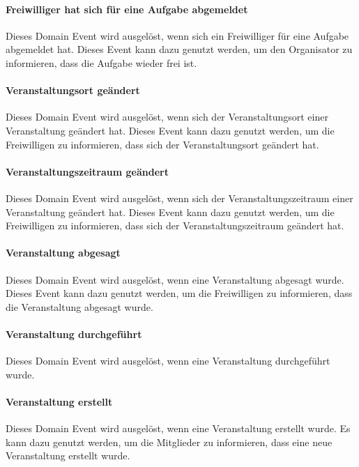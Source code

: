 \paragraph{\glqq Freiwilliger hat sich für eine Aufgabe abgemeldet\grqq}
Dieses Domain Event wird ausgelöst, wenn sich ein Freiwilliger für eine Aufgabe abgemeldet hat. Dieses Event kann dazu genutzt werden, um den Organisator zu informieren, dass die Aufgabe wieder frei ist.

\paragraph{\glqq Veranstaltungsort geändert\grqq}
Dieses Domain Event wird ausgelöst, wenn sich der Veranstaltungsort einer Veranstaltung geändert hat. Dieses Event kann dazu genutzt werden, um die Freiwilligen zu informieren, dass sich der Veranstaltungsort geändert hat.

\paragraph{\glqq Veranstaltungszeitraum geändert\grqq}
Dieses Domain Event wird ausgelöst, wenn sich der Veranstaltungszeitraum einer Veranstaltung geändert hat. Dieses Event kann dazu genutzt werden, um die Freiwilligen zu informieren, dass sich der Veranstaltungszeitraum geändert hat.

\paragraph{\glqq Veranstaltung abgesagt\grqq}
Dieses Domain Event wird ausgelöst, wenn eine Veranstaltung abgesagt wurde. Dieses Event kann dazu genutzt werden, um die Freiwilligen zu informieren, dass die Veranstaltung abgesagt wurde.

\paragraph{\glqq Veranstaltung durchgeführt\grqq}
Dieses Domain Event wird ausgelöst, wenn eine Veranstaltung durchgeführt wurde.

\paragraph{\glqq Veranstaltung erstellt\grqq}
Dieses Domain Event wird ausgelöst, wenn eine Veranstaltung erstellt wurde. Es kann dazu genutzt werden, um die Mitglieder zu informieren, dass eine neue Veranstaltung erstellt wurde.

